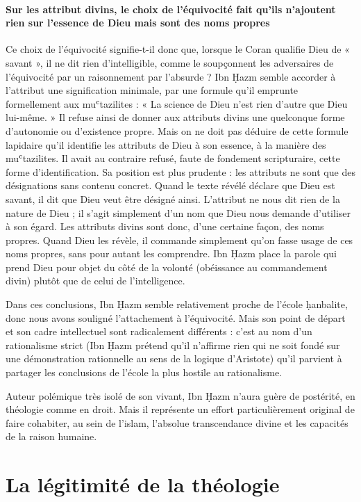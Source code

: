 \paragraph{Sur les attribut divins, le choix de l'équivocité fait qu'ils n'ajoutent rien sur l'essence de Dieu mais sont des noms propres}Ce choix de l'équivocité signifie-t-il donc que, lorsque le Coran
qualifie Dieu de « savant », il ne dit rien d'intelligible, comme le
soupçonnent les adversaires de l'équivocité par un raisonnement par
l'absurde ? Ibn Ḥazm semble accorder à l'attribut une signification
minimale, par une formule qu'il emprunte formellement aux muʿtazilites :
« La science de Dieu n'est rien d'autre que Dieu lui-même. » Il refuse
ainsi de donner aux attributs divins une quelconque forme d'autonomie ou
d'existence propre. Mais on ne doit pas déduire de cette formule
lapidaire qu'il identifie les attributs de Dieu à son essence, à la
manière des muʿtazilites. Il avait au contraire refusé, faute de
fondement scripturaire, cette forme d'identification. Sa position est
plus prudente : les attributs ne sont que des désignations sans contenu
concret. Quand le texte révélé déclare que Dieu est savant, il dit que
Dieu veut être désigné ainsi. L'attribut ne nous dit rien de la nature
de Dieu ; il s'agit simplement d'un nom que Dieu nous demande d'utiliser
à son égard. Les attributs divins sont donc, d'une certaine façon, des
noms propres. Quand Dieu les révèle, il commande simplement qu'on fasse
usage
de ces noms propres, sans pour autant les comprendre. Ibn Ḥazm place la
parole qui prend Dieu pour objet du côté de la volonté (obéissance au
commandement divin) plutôt que de celui de l'intelligence.

Dans ces conclusions, Ibn Ḥazm semble relativement proche de l'école
ḥanbalite, donc nous avons souligné l'attachement à l'équivocité. Mais
son point de départ et son cadre intellectuel sont radicalement
différents : c'est au nom d'un rationalisme strict (Ibn Ḥazm prétend
qu'il n'affirme rien qui ne soit fondé sur une démonstration rationnelle
au sens de la logique d'Aristote) qu'il parvient à partager les
conclusions de l'école la plus hostile au rationalisme.

Auteur polémique très isolé de son vivant, Ibn Ḥazm n'aura guère de
postérité, en théologie comme en droit. Mais il représente un effort
particulièrement original de faire cohabiter, au sein de l'islam,
l'absolue transcendance divine et les capacités de la raison humaine.

\hypertarget{la-luxe9gitimituxe9-de-la-thuxe9ologie}{%
\section{La légitimité de la
théologie}\label{la-luxe9gitimituxe9-de-la-thuxe9ologie}}

